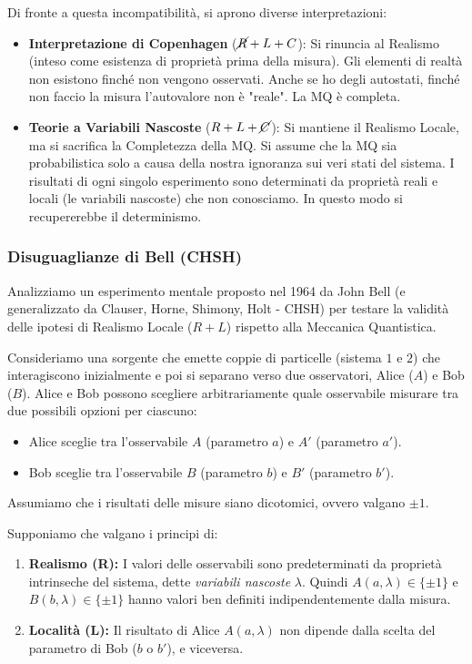 Di fronte a questa incompatibilità, si aprono diverse interpretazioni:

\begin{itemize}
    \item \textbf{Interpretazione di Copenhagen} (\(\cancel{R} + L + C\)):
    Si rinuncia al Realismo (inteso come esistenza di proprietà prima della misura). Gli elementi di realtà non esistono finché non vengono osservati. Anche se ho degli autostati, finché non faccio la misura l'autovalore non è "reale". La MQ è completa.

    \item \textbf{Teorie a Variabili Nascoste} (\(R + L + \cancel{C}\)):
    Si mantiene il Realismo Locale, ma si sacrifica la Completezza della MQ.
    Si assume che la MQ sia probabilistica solo a causa della nostra ignoranza sui veri stati del sistema.
    I risultati di ogni singolo esperimento sono determinati da proprietà reali e locali (le variabili nascoste) che non conosciamo. In questo modo si recupererebbe il determinismo.
\end{itemize}

\subsubsection{Disuguaglianze di Bell (CHSH)}

Analizziamo un esperimento mentale proposto nel 1964 da John Bell (e generalizzato da Clauser, Horne, Shimony, Holt - CHSH) per testare la validità delle ipotesi di Realismo Locale ($R+L$) rispetto alla Meccanica Quantistica.

Consideriamo una sorgente che emette coppie di particelle (sistema $1$ e $2$) che interagiscono inizialmente e poi si separano verso due osservatori, Alice ($A$) e Bob ($B$).
Alice e Bob possono scegliere arbitrariamente quale osservabile misurare tra due possibili opzioni per ciascuno:
\begin{itemize}
    \item Alice sceglie tra l'osservabile $A$ (parametro $a$) e $A'$ (parametro $a'$).
    \item Bob sceglie tra l'osservabile $B$ (parametro $b$) e $B'$ (parametro $b'$).
\end{itemize}
Assumiamo che i risultati delle misure siano dicotomici, ovvero valgano $\pm 1$.

Supponiamo che valgano i principi di:
\begin{enumerate}
    \item \textbf{Realismo (R):} I valori delle osservabili sono predeterminati da proprietà intrinseche del sistema, dette \textit{variabili nascoste} $\lambda$. Quindi $A(a, \lambda) \in \{\pm 1\}$ e $B(b, \lambda) \in \{\pm 1\}$ hanno valori ben definiti indipendentemente dalla misura.
    \item \textbf{Località (L):} Il risultato di Alice $A(a, \lambda)$ non dipende dalla scelta del parametro di Bob ($b$ o $b'$), e viceversa.
\end{enumerate}

